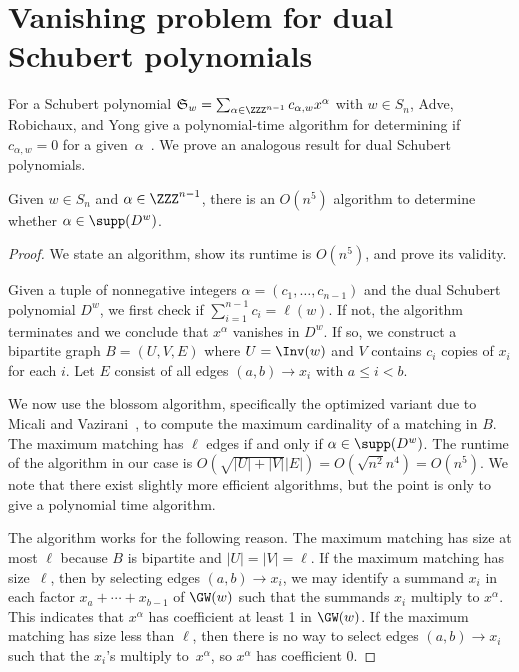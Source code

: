 \section{Vanishing problem for dual Schubert polynomials}\label{section:vanishing}

For a Schubert polynomial $\mathfrak{S}_w = \sum_{\alpha \in \ZZZ^{n-1}} c_{\alpha,w}x^{\alpha}$ with $w \in S_n$, Adve, Robichaux, and Yong give a polynomial-time algorithm for determining if $c_{\alpha,w} = 0$ for a given~$\alpha$~\cite{ARY}. We prove an analogous result for dual Schubert polynomials.
\begin{theorem}\label{thm:vanish}
    Given $w \in S_n$ and $\alpha \in \ZZZ^{n-1}$, there is an $O(n^5)$ algorithm to determine whether $\alpha \in \supp(D^w)$.
\end{theorem}
\begin{proof}
    We state an algorithm, show its runtime is $O(n^5)$, and prove its validity. 

    Given a tuple of nonnegative integers $\alpha = (c_1, \ldots, c_{n-1})$ and the dual Schubert polynomial $D^w$, we first check if $\sum_{i=1}^{n-1} c_i = \ell(w)$. If not, the algorithm terminates and we conclude that $x^\alpha$ vanishes in $D^w$. If so, we construct a bipartite graph $B = (U,V,E)$ where $U = \Inv(w)$ and 
    $V$ contains $c_i$ copies of $x_i$ for each $i$. 
    Let $E$ consist of all edges $(a,b) \to x_i$ with $a \le i < b$. 

    We now use the blossom algorithm, specifically the optimized variant due to Micali and Vazirani~\cite{inproceedings}, to compute the maximum cardinality of a matching in $B$. The maximum matching has $\ell$ edges if and only if $ \alpha \in \supp(D^w)$. The runtime of the algorithm in our case is $O(\sqrt{|U|+|V|}|E|) = O(\sqrt{n^2}n^4) = O(n^5)$. We note that there exist slightly more efficient algorithms, but the point is only to give a polynomial time algorithm.

    The algorithm works for the following reason. The maximum matching has size at most $\ell$ because $B$ is bipartite and $|U| = |V| = \ell$. If the maximum matching has size~$\ell$, then by selecting edges $(a,b) \to x_i$, we may identify a summand $x_i$ in each factor $x_a + \cdots + x_{b-1}$ of $\GW(w)$ such that the summands $x_i$ multiply to $x^\alpha$. This indicates that $x^\alpha$ has coefficient at least 1 in $\GW(w)$. If the maximum matching has size less than $\ell$, then there is no way to select edges $(a,b) \to x_i$ such that the $x_i$'s multiply to~$x^\alpha$, so $x^{\alpha}$ has coefficient 0.
\end{proof}

